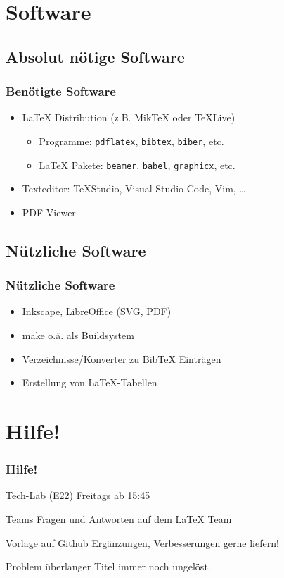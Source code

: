\documentclass{beamer}
\begin{document}
\section{Software}
\subsection{Absolut nötige Software}
\begin{frame}
	\frametitle{Benötigte Software}
	\begin{itemize}
		\item \LaTeX{} Distribution (z.B. MikTeX oder TeXLive)
			\begin{itemize}
				\item Programme: {\tt pdflatex}, {\tt bibtex}, {\tt biber}, etc.
				\item \LaTeX{} Pakete: {\tt beamer}, {\tt babel}, {\tt graphicx}, etc.
			\end{itemize}
		\item Texteditor: TeXStudio, Visual Studio Code, Vim, \ldots
		\item PDF-Viewer
	\end{itemize}
\end{frame}

\subsection{Nützliche Software}
\begin{frame}
	\frametitle{Nützliche Software}
	\begin{itemize}
		\item Inkscape, LibreOffice (SVG, PDF)
		\item make o.ä. als Buildsystem
		\item Verzeichnisse/Konverter zu Bib\TeX{} Einträgen
		\item Erstellung von \LaTeX{}-Tabellen
	\end{itemize}
\end{frame}



\section{Hilfe!}
\begin{frame}
	\frametitle{Hilfe!}
	\begin{block}{Tech-Lab (E22)}
		Freitags ab 15:45 
	\end{block}
	\begin{block}{Teams}
		Fragen und Antworten auf dem \LaTeX{} Team
	\end{block}
	\begin{block}{Vorlage auf Github}
		Ergänzungen, Verbesserungen gerne liefern!

		{\scriptsize Problem überlanger Titel immer noch ungelöst.}
	\end{block}
\end{frame}
\end{document}
